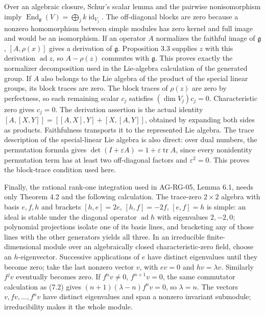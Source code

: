 \documentclass[11pt,a4paper,openany]{report}
\begin{document}
Over an algebraic closure, Schur's scalar lemma and the pairwise nonisomorphism imply \(\operatorname{End}_{\mathfrak g}(V)=\bigoplus_j k\operatorname{id}_{V_j}\). The off-diagonal blocks are zero because a nonzero homomorphism between simple modules has zero kernel and full image and would be an isomorphism. If an operator \(A\) normalizes the faithful image of \(\mathfrak g\), \([A,\rho(x)]\) gives a derivation of \(\mathfrak g\). Proposition 3.3 supplies \(z\) with this derivation \(\operatorname{ad}z\), so \(A-\rho(z)\) commutes with \(\mathfrak g\). This proves exactly the normalizer decomposition used in the Lie-algebra calculation of the generated group. If \(A\) also belongs to the Lie algebra of the product of the special linear groups, its block traces are zero. The block traces of \(\rho(z)\) are zero by perfectness, so each remaining scalar \(c_j\) satisfies \((\dim V_j)c_j=0\). Characteristic zero gives \(c_j=0\). The derivation assertion is the actual identity \([A,[X,Y]]=[[A,X],Y]+[X,[A,Y]]\), obtained by expanding both sides as products. Faithfulness transports it to the represented Lie algebra. The trace description of the special-linear Lie algebra is also direct: over dual numbers, the permutation formula gives \(\det(I+\varepsilon A)=1+\varepsilon\operatorname{tr}A\), since every nonidentity permutation term has at least two off-diagonal factors and \(\varepsilon^2=0\). This proves the block-trace condition used here.

Finally, the rational rank-one integration used in AG-RG-05, Lemma 6.1, needs only Theorem 4.2 and the following calculation. The trace-zero \(2\times2\) algebra with basis \(e,f,h\) and brackets \([h,e]=2e\), \([h,f]=-2f\), \([e,f]=h\) is simple: an ideal is stable under the diagonal operator \(\operatorname{ad}h\) with eigenvalues \(2,-2,0\); polynomial projections isolate one of its basis lines, and bracketing any of those lines with the other generators yields all three. In an irreducible finite-dimensional module over an algebraically closed characteristic-zero field, choose an \(h\)-eigenvector. Successive applications of \(e\) have distinct eigenvalues until they become zero; take the last nonzero vector \(v\), with \(ev=0\) and \(hv=\lambda v\). Similarly \(f^jv\) eventually becomes zero. If \(f^nv\ne0\), \(f^{n+1}v=0\), the same commutator calculation as (7.2) gives \((n+1)(\lambda-n)f^nv=0\), so \(\lambda=n\). The vectors \(v,fv,\ldots,f^nv\) have distinct eigenvalues and span a nonzero invariant submodule; irreducibility makes it the whole module.
\end{document}
